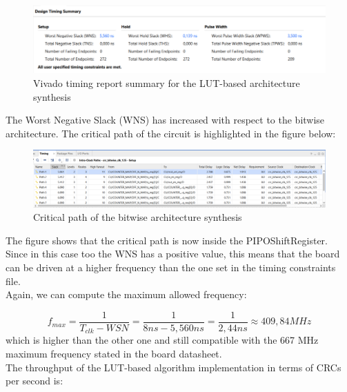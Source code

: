 \begin{figure}[H]
    \begin{center}
        \includegraphics[scale=.75,clip]{img/vivado_lut_timing.png}
    \end{center}
    \vspace*{-0.5cm}
    \caption{Vivado timing report summary for the LUT-based architecture synthesis}
    \label{fig:vivado_bit_timing}
\end{figure}
\hfill \break
The Worst Negative Slack (WNS) has increased with respect to the bitwise architecture. The critical path of the circuit is highlighted in the figure below:

\begin{figure}[H]
    \begin{center}
        \includegraphics[scale=.5,clip]{img/vivado_bit_critical_path.png}
    \end{center}
    \vspace*{-0.5cm}
    \caption{Critical path of the bitwise architecture synthesis}
    \label{fig:vivado_bit_critical_path}
\end{figure}
\hfill \break
The figure shows that the critical path is now inside the PIPOShiftRegister.\\
Since in this case too the WNS has a positive value, this means that the board can be driven at a higher frequency than the one set in the timing constraints file.\\
Again, we can compute the maximum allowed frequency:

\begin{equation}\label{eq:max_freq}
f_{max} = \frac{1}{T_{clk} - WSN} = \frac{1}{8 ns - 5,560 ns} = \frac{1}{2,44 ns} \approx 409,84 MHz
\end{equation}
\hfill \break
which is higher than the other one and still compatible with the 667 MHz maximum frequency stated in the board datasheet.\\
\hfill \break
The throughput of the LUT-based algorithm implementation in terms of CRCs per second is:

